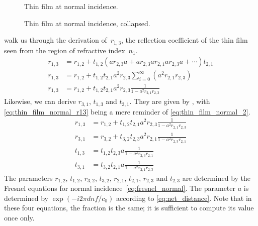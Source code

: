 \begin{figure}[hbtp]
    \centering
    
    \caption{Thin film at normal incidence.}
    \label{fig:thin_film_normal}
\end{figure}
\begin{figure}[hbtp]
    \centering
    
    \caption{Thin film at normal incidence, collapsed.}
    \label{fig:thin_film_normal_collapsed}
\end{figure}

 walk us through the derivation of~$r_{1, 3}$, the reflection coefficient of the thin film seen from the region of refractive index~$n_1$.
\begin{align}
    r_{1,3}
    &= r_{1,2} + t_{1,2}
        \left(
            a r_{2,3} a +
            a r_{2,3} a r_{2,1} a r_{2,3} a +
            \cdots
        \right)
       t_{2,1}
    \label{eq:thin_film_normal_0}
    \\
    r_{1, 3}
    &=
    r_{1, 2} + t_{1, 2} t_{2, 1} a^2r_{2, 3}
        \sum_{i=0}^{\infty} (a^2r_{2,1}r_{2,3})
    \label{eq:thin_film_normal_1}
    \\
    r_{1, 3}
    &=
    r_{1, 2} + t_{1, 2} t_{2, 1} a^2 r_{2, 3}
    \frac{1}{1 - a^2 r_{2, 1} r_{2, 3}}
    \label{eq:thin_film_normal_2}
\end{align}
Likewise, we can derive $r_{3, 1}$, $t_{1, 3}$ and $t_{3, 1}$.
They are given by ,
with \cref{eq:thin_film_normal_r13} being a mere reminder of \cref{eq:thin_film_normal_2}.
\begin{subequations}
    \begin{align}
        r_{1, 3}
        &=
        r_{1, 2} + t_{1, 2} t_{2, 1} a^2 r_{2, 3}
        \frac{1}{1 - a^2 r_{2, 1} r_{2, 3}}
        \label{eq:thin_film_normal_r13}
        \\
        r_{3, 1}
        &=
        r_{3, 2} + t_{3, 2} t_{2, 3} a^2 r_{2, 1}
        \frac{1}{1 - a^2 r_{2, 3} r_{2, 1}}
        \label{eq:thin_film_normal_r31}
        \\
        t_{1, 3}
        &=
        t_{1,2} t_{2,3} a \frac{1}{1 - a^2 r_{2, 3} r_{2, 1}}
        \label{eq:thin_film_normal_t13}
        \\
        t_{3, 1}
        &=
        t_{3,2} t_{2,1} a \frac{1}{1 - a^2 r_{2, 1} r_{2, 3}}
        \label{eq:thin_film_normal_t31}
    \end{align}
\end{subequations}
The parameters $r_{1, 2}$, $t_{1, 2}$, $r_{3, 2}$, $t_{3, 2}$, $r_{2, 1}$, $t_{2, 1}$,
$r_{2, 3}$ and $t_{2, 3}$ are determined by the Fresnel equations for normal incidence~\eqref{eq:fresnel_normal}.
The parameter $a$ is determined by $\exp(-i 2 \pi d n f / c_0)$ according to \cref{eq:net_distance}.
Note that in these four equations, the fraction is the same;
it is sufficient to compute its value once only.



